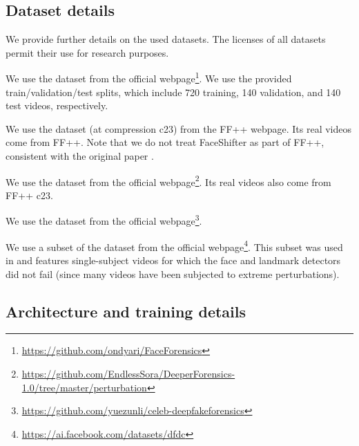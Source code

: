 \documentclass[10pt,twocolumn,letterpaper]{article}
\begin{document}
\subsection{Dataset details} \label{sec:datasets}

We provide further details on the used datasets. The licenses of all datasets permit their use for research purposes.

\begin{description}[wide,itemindent=\labelsep]
\item[FaceForensics++ \cite{rossler2019faceforensics++} (FF++).] We use the dataset from the official webpage\footnote{\url{https://github.com/ondyari/FaceForensics}}. We use the provided train/validation/test splits, which include 720 training, 140 validation, and 140 test videos, respectively.
\item[FaceShifter \cite{li2020advancing}.] We use the dataset (at compression c23) from the FF++ webpage. Its real videos come from FF++. Note that we do not treat FaceShifter as part of FF++, consistent with the original paper \cite{rossler2019faceforensics++}.

\item[DeeperForensics \cite{jiang2020deeperforensics}.] We use the dataset from the official webpage\footnote{\url{https://github.com/EndlessSora/DeeperForensics-1.0/tree/master/perturbation}}. Its real videos also come from FF++ c23.

\item[CelebFD-v2 \cite{li2020celeb}.] We use the dataset from the official webpage\footnote{\url{https://github.com/yuezunli/celeb-deepfakeforensics}}.

\item[DFDC \cite{dolhansky2020deepfake}.] We use a subset of the dataset from the official webpage\footnote{\url{https://ai.facebook.com/datasets/dfdc}}. This subset was used in \cite{haliassos2021lips} and features single-subject videos for which the face and landmark detectors did not fail (since many videos have been subjected to extreme perturbations).

\end{description}

\subsection{Architecture and training details} 
\label{sec:arch_train_details}
\end{document}
